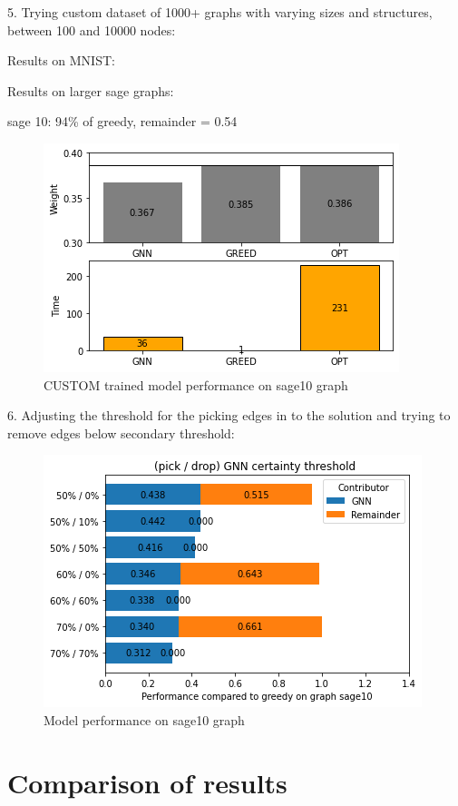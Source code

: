 5. Trying custom dataset of 1000+ graphs with varying sizes and structures, between 100 and 10000 nodes:

Results on MNIST: 

Results on larger sage graphs:

sage 10: 94\% of greedy, remainder =  0.54

\begin{figure}[H]
    \centering
    \includegraphics[scale=1.0]{figures/CUSTOMtrainSAGE10}
    \caption{CUSTOM trained model performance on sage10 graph}
    \label{model performance}
\end{figure}


6. Adjusting the threshold for the picking edges in to the solution and trying to remove edges below secondary threshold:

\begin{figure}[H]
    \centering
    \includegraphics[scale=1.0]{figures/ThresholdDemo}
    \caption{Model performance on sage10 graph}
    \label{Model performance on sage10 graph}
\end{figure}


\section{Comparison of results}



